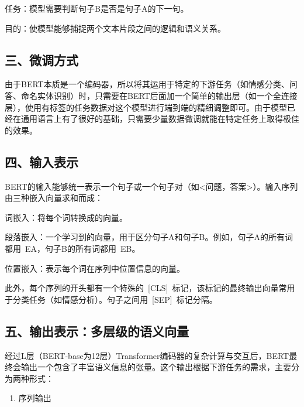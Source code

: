 任务：模型需要判断句子B是否是句子A的下一句。

目的：使模型能够捕捉两个文本片段之间的逻辑和语义关系。

\hypertarget{ux4e09ux5faeux8c03ux65b9ux5f0f}{%
\subsection{三、微调方式}\label{ux4e09ux5faeux8c03ux65b9ux5f0f}}

由于BERT本质是一个编码器，所以将其运用于特定的下游任务（如情感分类、问答、命名实体识别）时，只需要在BERT后面加一个简单的输出层（如一个全连接层），使用有标签的任务数据对这个模型进行端到端的精细调整即可。由于模型已经在通用语言上有了很好的基础，只需要少量数据微调就能在特定任务上取得极佳的效果。

\hypertarget{ux56dbux8f93ux5165ux8868ux793a}{%
\subsection{四、输入表示}\label{ux56dbux8f93ux5165ux8868ux793a}}

BERT的输入能够统一表示一个句子或一个句子对（如\textless 问题，答案\textgreater）。输入序列由三种嵌入向量求和而成：

词嵌入：将每个词转换成的向量。

段落嵌入：一个学习到的向量，用于区分句子A和句子B。例如，句子A的所有词都用~EA，句子B的所有词都用~EB。

位置嵌入：表示每个词在序列中位置信息的向量。

此外，每个序列的开头都有一个特殊的~{[}CLS{]}~标记，该标记的最终输出向量常用于分类任务（如情感分析）。句子之间用~{[}SEP{]}~标记分隔。

\hypertarget{ux4e94ux8f93ux51faux8868ux793aux591aux5c42ux7ea7ux7684ux8bedux4e49ux5411ux91cf}{%
\subsection{五、输出表示：多层级的语义向量}\label{ux4e94ux8f93ux51faux8868ux793aux591aux5c42ux7ea7ux7684ux8bedux4e49ux5411ux91cf}}

经过L层（BERT-base为12层）Transformer编码器的复杂计算与交互后，BERT最终会输出一个包含了丰富语义信息的张量。这个输出根据下游任务的需求，主要分为两种形式：

\begin{enumerate}
\def\labelenumi{\arabic{enumi}.}
\tightlist
\item
  序列输出
\end{enumerate}

